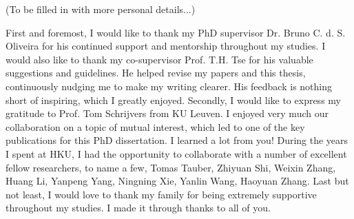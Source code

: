 
(To be filled in with more personal details...)

First and foremost, I would like to thank my PhD supervisor Dr. Bruno C. d. S.
Oliveira for his continued support and mentorship throughout my studies. I would
also like to thank my co-supervisor Prof. T.H. Tse for his valuable suggestions
and guidelines. He helped revise my papers and this thesis, continuously nudging
me to make my writing clearer. His feedback is nothing short of inspiring, which
I greatly enjoyed. Secondly, I would like to express my gratitude to Prof. Tom
Schrijvers from KU Leuven. I enjoyed very much our collaboration on a topic of
mutual interest, which led to one of the key publications for this PhD
dissertation. I learned a lot from you! During the years I spent at HKU, I had
the opportunity to collaborate with a number of excellent fellow researchers, to
name a few, Tomas Tauber, Zhiyuan Shi, Weixin Zhang, Huang Li, Yanpeng Yang,
Ningning Xie, Yanlin Wang, Haoyuan Zhang. Last but not least, I would love to
thank my family for being extremely supportive throughout my studies. I made it
through thanks to all of you.